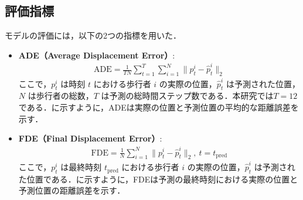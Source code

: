 \subsection{評価指標}
モデルの評価には，以下の2つの指標を用いた．

\begin{itemize}
  \item \textbf{ADE（Average Displacement Error）}\cite{pellegrini2009you-eth}:
    \begin{align}
      \text{ADE} = \frac{1}{TN} \sum_{t=1}^{T} \sum_{i=1}^{N} \| p^i_t - \hat{p}^i_t \|_2
    \end{align}
    ここで，$p^i_t$ は時刻 $t$ における歩行者 $i$ の実際の位置，$\hat{p}^i_t$ は予測された位置，$N$ は歩行者の総数，$T$ は予測の総時間ステップ数である．本研究では$T = 12$である．に示すように，ADEは実際の位置と予測位置の平均的な距離誤差を示す．
    \\
    \item \textbf{FDE（Final Displacement Error）}\cite{s-lstm}:
    \begin{align}
      \text{FDE} = \frac{1}{N} \sum_{i=1}^{N} \| p^i_t - \hat{p}^i_t \|_2 , \ t = t_{\text{pred}}
    \end{align}
    ここで，$p^i_t$ は最終時刻 $t_{\text{pred}}$ における歩行者 $i$ の実際の位置，$\hat{p}^i_t$ は予測された位置である．に示すように，FDEは予測の最終時刻における実際の位置と予測位置の距離誤差を示す．
\end{itemize}

